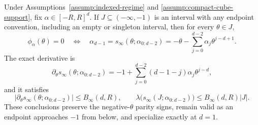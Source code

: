 \begin{proposition}
\label{prop:negative-outer-certificate}
Under Assumptions~\ref{assump:indexed-regime} and
\ref{assump:compact-cube-support}, fix $\alpha\in[-R,R]^d$.  If
$J\subseteq(-\infty,-1)$ is an interval with any endpoint convention,
including an empty or singleton interval, then for every $\theta\in J$,
\[
\phi_\alpha(\theta)=0
\quad\Longleftrightarrow\quad
\alpha_{d-1}=s_\infty(\theta;\alpha_{0:d-2})
=-\theta-\sum_{j=0}^{d-2}\alpha_j\theta^{j-d+1}.
\]
The exact derivative is
\[
\partial_\theta s_\infty(\theta;\alpha_{0:d-2})
=-1+\sum_{j=0}^{d-2}(d-1-j)\alpha_j\theta^{j-d},
\]
and it satisfies
\[
|\partial_\theta s_\infty(\theta;\alpha_{0:d-2})|
\leq B_\infty(d,R),
\qquad
\lambda\bigl(s_\infty(J;\alpha_{0:d-2})\bigr)
\leq B_\infty(d,R)|J|.
\]
These conclusions preserve the negative-$\theta$ parity signs, remain valid
as an endpoint approaches $-1$ from below, and specialize exactly at $d=1$.
\end{proposition}

